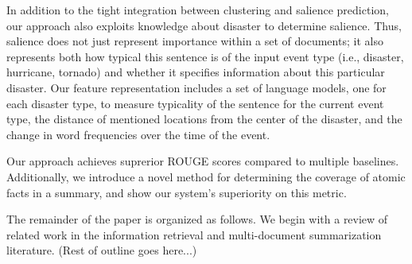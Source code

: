 


In addition to the tight integration between clustering and salience
prediction, our approach also exploits knowledge about disaster to determine
salience. Thus, salience does not just represent importance within a set of
documents; it also represents both how typical this sentence is of the input 
event
type (i.e., disaster, hurricane, tornado) and whether it specifies information
about this particular disaster. 
Our feature representation includes a set of language models, one for each
disaster type, to measure typicality of the sentence for the current event 
type, the distance of mentioned locations from the center of
the disaster, and the change in word frequencies over the time of the event.

Our approach achieves suprerior ROUGE scores compared to multiple baselines.
Additionally, we introduce a novel method for determining the 
coverage of atomic facts in a summary, and show our system's
superiority on this metric. 

The remainder of the paper is organized as follows.
We begin with a review of related work
in the information retrieval and multi-document
summarization literature. (Rest of outline goes here...)




